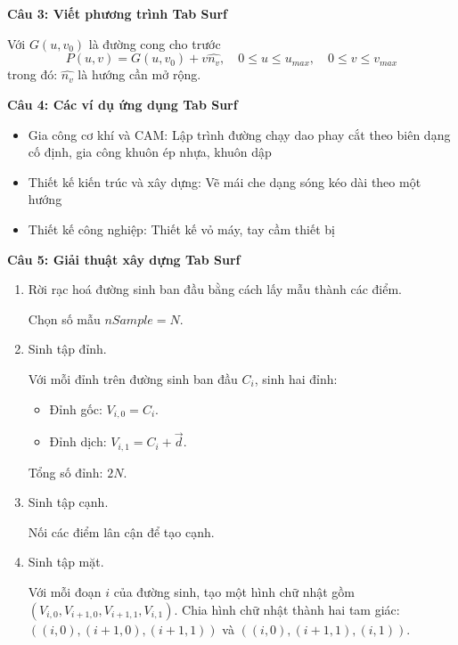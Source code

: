 \textbf{Câu 3: Viết phương trình Tab Surf}

Với $G(u, v_0)$ là đường cong cho trước
\[P(u, v) = G(u, v_0) + v \hat{n_v}, \quad 0 \le u \le u_{max}, \quad 0 \le v \le v_{max}\]
trong đó: $\hat{n_v}$ là hướng cần mở rộng.

\textbf{Câu 4: Các ví dụ ứng dụng Tab Surf}

\begin{itemize}
	\item Gia công cơ khí và CAM: Lập trình đường chạy dao phay cắt theo biên dạng cố định, gia công khuôn ép nhựa, khuôn dập
	
	\item Thiết kế kiến trúc và xây dựng: Vẽ mái che dạng sóng kéo dài theo một hướng
	
	\item Thiết kế công nghiệp: Thiết kế vỏ máy, tay cầm thiết bị
\end{itemize}

\textbf{Câu 5: Giải thuật xây dựng Tab Surf}

\begin{enumerate}
	\item Rời rạc hoá đường sinh ban đầu bằng cách lấy mẫu thành các điểm.
	
	Chọn số mẫu $nSample = N$.
	
	\item Sinh tập đỉnh.
	
	Với mỗi đỉnh trên đường sinh ban đầu $C_i$, sinh hai đỉnh:
	
	\begin{itemize}
		\item Đỉnh gốc: $V_{i, 0} = C_i$.
		
		\item Đỉnh dịch: $V_{i, 1} = C_i + \vec{d}$.
	\end{itemize}
	
	Tổng số đỉnh: $2N$.
	
	\item Sinh tập cạnh.
	
	Nối các điểm lân cận để tạo cạnh.
	
	\item Sinh tập mặt.
	
	Với mỗi đoạn $i$ của đường sinh, tạo một hình chữ nhật gồm $(V_{i, 0}, V_{i + 1, 0}, V_{i + 1, 1}, V_{i, 1})$. Chia hình chữ nhật thành hai tam giác: $( (i, 0), (i + 1, 0), (i + 1, 1) )$ và $( (i, 0), (i + 1, 1), (i, 1) )$.
\end{enumerate}

